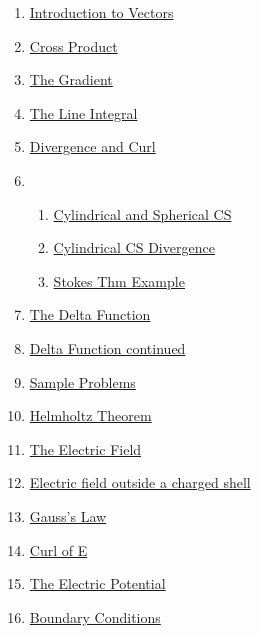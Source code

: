 \documentclass[11pt]{article}
\begin{document}
\begin{multicols}{2}
	\begin{enumerate}
		\item \href{https://mp.weixin.qq.com/s/NZdMcoM8xSPUkEAylvMd4Q}{Introduction to Vectors}	%
		\item \href{https://mp.weixin.qq.com/s/9AasyCimVvHMo3f4EZTXoA}{Cross Product}	%
		\item \href{https://mp.weixin.qq.com/s/oUAaULSHxkwkQL1t5nzgpA}{The Gradient}	%
		\item \href{https://mp.weixin.qq.com/s/rcalc1KBCR_5g6St2wT_4Q}{The Line Integral}	%
		\item \href{https://mp.weixin.qq.com/s/mYVvDVtl5ms2DsatDkcrFw}{Divergence and Curl}	%
		\item %
		\begin{enumerate}
			\item \href{https://mp.weixin.qq.com/s/saWPBK3KAEqy-ZWuBxz3jA}{Cylindrical and Spherical CS}	%
			\item \href{https://mp.weixin.qq.com/s/gPcf2XwTk7j9hsznrJaYOQ}{Cylindrical CS Divergence}	%
			\item \href{https://mp.weixin.qq.com/s/Y0SsbiKw_6Hn-WuR4PdYBw}{Stokes Thm Example}	%
		\end{enumerate}
		\item \href{https://mp.weixin.qq.com/s/CfyhD8MIyn6xeI7g_LJueA}{The Delta Function}	%
		\item \href{https://mp.weixin.qq.com/s/6TlfLo6FWlnCUDRNEM1bZQ}{Delta Function continued}	%
		\item \href{https://mp.weixin.qq.com/s/YFhwukTdK4uV7Q8TfE6sTw}{Sample Problems}	%
		\item \href{https://mp.weixin.qq.com/s/vFFcfEjcP4lJnJ-o_a7CaQ}{Helmholtz Theorem}	%
		\item \href{https://mp.weixin.qq.com/s/RQFeT64LoPrQ7OQkamoyBw}{The Electric Field}	%
		\item \href{https://mp.weixin.qq.com/s/5QvIjUMGtRBeh1YStNQSvA}{Electric field outside a charged shell}	%
		\item \href{https://mp.weixin.qq.com/s/V7Nbw-FhxEVt1y5gS1cHZQ}{Gauss's Law}	%
		\item \href{https://mp.weixin.qq.com/s/-USF1znpoufzpcZxWRGq_Q}{Curl of E}	%
		\item \href{https://mp.weixin.qq.com/s/90J7bGePz4TwAWzAtWcAbw}{The Electric Potential}	%
		\item \href{https://mp.weixin.qq.com/s/juF1hPujjOV7Hm5z5XJitg}{Boundary Conditions}	%

\end{enumerate}
\end{multicols}
\end{document}

